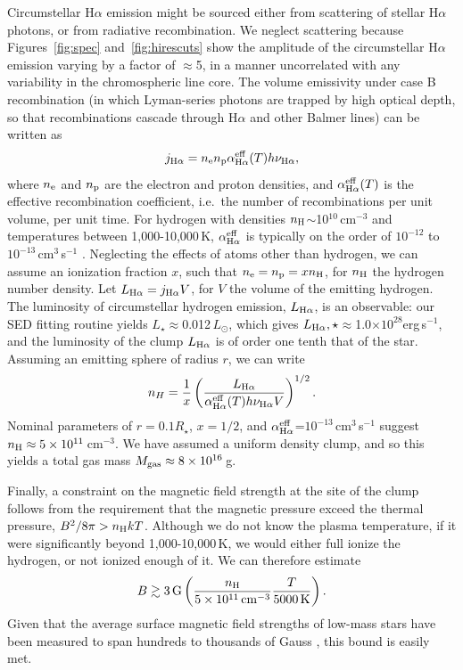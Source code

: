 \documentclass{nature3}
\begin{document}
\begin{methods}
Circumstellar H$\alpha$ emission might be sourced either from
scattering of stellar H$\alpha$ photons, or from radiative
recombination.  We neglect scattering because Figures~\ref{fig:spec}
and~\ref{fig:hirescuts} show the amplitude of the circumstellar
H$\alpha$ emission varying by a factor of $\approx$5, in a manner
uncorrelated with any variability in the chromospheric line core.  The
volume emissivity under case B recombination (in which Lyman-series
photons are trapped by high optical depth, so that recombinations
cascade through H$\alpha$ and other Balmer lines) can be written as
\begin{equation}
  j_{\rm H\alpha} = n_{\rm e} n_{\rm p} \alpha^{\rm eff}_{\rm H\alpha}(T) h \nu_{\rm H\alpha},
\end{equation}
where $n_{\rm e}$ and $n_{\rm p}$ are the electron and proton densities,
and $\alpha^{\rm eff}_{\rm H\alpha}(T)$ is the effective recombination
coefficient, i.e.\ the number of recombinations per unit volume, per
unit time.
For hydrogen with 
densities $n_{\rm H}$$\sim$10$^{10}$\,cm$^{-3}$ and 
temperatures between 1,000-10,000\,K,
$\alpha^{\rm eff}_{\rm H\alpha}$ is typically on the order of $10^{-12}$ to
$10^{-13}$\,cm$^3$\,s$^{-1}$ \cite{Hummer1987,Draine2011}.
Neglecting the effects of atoms other than hydrogen, we can assume
an ionization fraction $x$, such that $n_{\rm e} = n_{\rm p} = x
n_{\rm H}$, for $n_{\rm H}$ the hydrogen number density.  Let $L_{\rm
H\alpha} = j_{\rm H\alpha} V$, for $V$ the volume of the emitting
hydrogen.
The luminosity of circumstellar hydrogen emission, $L_{\rm H\alpha}$,
is an observable: our SED fitting routine yields
$L_\star$$\approx$0.012\,$L_\odot$, which gives
$L_{\rm H\alpha},\star$$\approx$1.0$\times$$10^{28}$erg\,s$^{-1}$, and
the luminosity of the clump $L_{\rm H\alpha}$ is of order one tenth
that of the star.
Assuming an emitting sphere of radius $r$, we can write
\begin{equation}
  n_H = \frac{1}{x}
  \left( 
    \frac{L_{\rm H\alpha}}{ \alpha^{\rm eff}_{\rm H\alpha}(T) h \nu_{\rm H\alpha} V }
  \right)^{1/2}.
\end{equation}
Nominal parameters of $r = 0.1 R_\star$, $x=1/2$, and
$\alpha^{\rm eff}_{\rm H\alpha}$=$10^{-13}$\,cm$^3$\,s$^{-1}$ suggest
$n_{\rm H}\approx 5\times10^{11}$\,cm$^{-3}$.
We have assumed a uniform density clump, and so this yields a total
gas mass $M_{\rm gas}\approx 8\times10^{16}$\,g.

Finally, a constraint on the magnetic field strength at the site of
the clump follows from the requirement that the magnetic pressure
exceed the thermal pressure, $B^2 / 8\pi > n_{\rm H} k T$.  Although
we do not know the plasma temperature, if it were significantly beyond
1,000-10,000\,K, we would either full ionize the hydrogen, or not
ionized enough of it.  We can therefore estimate
\begin{equation}
  B \gtrsim 3\,{\rm G}
  \left(
  \frac{n_{\rm H}}{5\times10^{11}\,{\rm cm}^{-3}}
  \frac{T}{5000\,{\rm K}}
  \right).
\end{equation}
Given that the average surface magnetic field strengths of low-mass
stars have been measured to span hundreds to thousands of Gauss
\cite{Donati2009,Kochukhov2021,Reiners2022}, this bound is easily met.


\end{methods}
\end{document}
